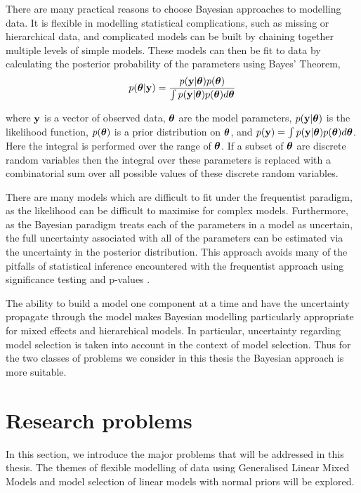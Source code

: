 There are many practical reasons to choose Bayesian approaches to modelling
data. It is flexible in modelling statistical complications, such as missing or
hierarchical data, and complicated models can be built by chaining together
multiple levels of simple models. These models can then be fit to data by
calculating the posterior probability of the parameters using Bayes' Theorem,
\[
	p({\boldsymbol \theta} | {\bf y}) = \frac{p({\bf y} | {\boldsymbol \theta}) p({\boldsymbol \theta})}{\int p({\bf y} | {\boldsymbol \theta}) p({\boldsymbol \theta}) d {\boldsymbol \theta}}
\]

\noindent where ${\bf y}$ is a vector of observed data, ${\boldsymbol \theta}$ are the model
parameters, $p({\bf y}|{\boldsymbol \theta})$ is the likelihood function, $p({\boldsymbol \theta})$ is a
prior distribution on ${\boldsymbol \theta}$, and $p({\bf y})=\int
p({\bf y}|{\boldsymbol \theta})p({\boldsymbol \theta})d{\boldsymbol \theta}$.  Here the integral is performed over the
range of ${\boldsymbol \theta}$. If a subset of ${\boldsymbol \theta}$ are discrete random variables
then the integral over these parameters is replaced with a combinatorial sum
over all possible values of these discrete random variables.

There are many models which are difficult to fit under the frequentist paradigm,
as the likelihood can be difficult to maximise for complex models. Furthermore,
as the Bayesian paradigm treats each of the parameters in a model as uncertain,
the full uncertainty associated with all of the parameters can be estimated via
the uncertainty in the posterior distribution. This approach avoids many of the
pitfalls of statistical inference encountered with the frequentist approach
using significance testing and p-values \citep{Cox2005}.

The ability to build a model one component at a time and have the uncertainty
propagate through the model makes Bayesian modelling  particularly appropriate
for mixed effects and hierarchical models. In particular, uncertainty regarding
model selection is taken into account in the context of model selection. Thus
for the two classes of problems we consider in this thesis the Bayesian approach
is more suitable.

\section{Research problems}

In this section, we introduce the major problems that will be addressed in this
thesis. The themes of flexible modelling of data using Generalised Linear Mixed
Models and model selection of linear models with normal priors  will be
explored.

